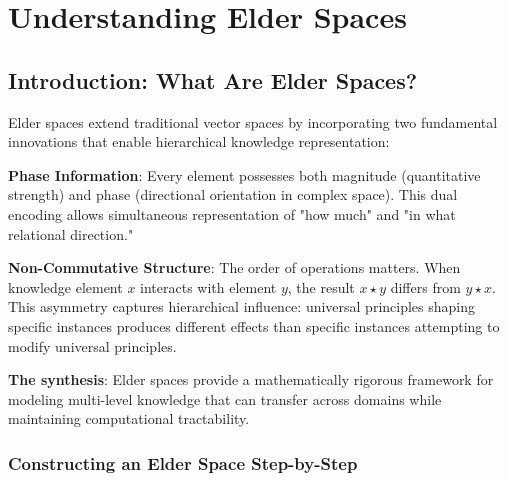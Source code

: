 
\chapter{Understanding Elder Spaces}

\section{Introduction: What Are Elder Spaces?}

\begin{intuition}
Elder spaces extend traditional vector spaces by incorporating two fundamental innovations that enable hierarchical knowledge representation:

\textbf{Phase Information}: Every element possesses both magnitude (quantitative strength) and phase (directional orientation in complex space). This dual encoding allows simultaneous representation of "how much" and "in what relational direction."

\textbf{Non-Commutative Structure}: The order of operations matters. When knowledge element $x$ interacts with element $y$, the result $x \star y$ differs from $y \star x$. This asymmetry captures hierarchical influence: universal principles shaping specific instances produces different effects than specific instances attempting to modify universal principles.

\textbf{The synthesis}: Elder spaces provide a mathematically rigorous framework for modeling multi-level knowledge that can transfer across domains while maintaining computational tractability.
\end{intuition}

\subsection{Constructing an Elder Space Step-by-Step}

